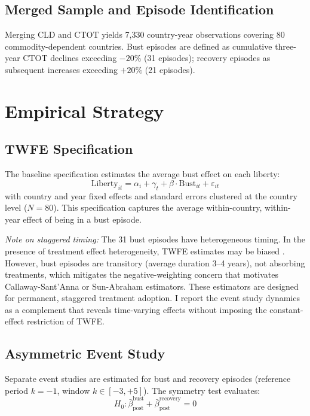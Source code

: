 \documentclass[12pt]{article}
\begin{document}
\subsection{Merged Sample and Episode Identification}

Merging CLD and CTOT yields 7,330 country-year observations covering 80 commodity-dependent countries. Bust episodes are defined as cumulative three-year CTOT declines exceeding $-20\%$ (31 episodes); recovery episodes as subsequent increases exceeding $+20\%$ (21 episodes).



\section{Empirical Strategy}

\subsection{TWFE Specification}

The baseline specification estimates the average bust effect on each liberty:
\begin{equation}
\text{Liberty}_{it} = \alpha_i + \gamma_t + \beta \cdot \text{Bust}_{it} + \varepsilon_{it}
\end{equation}
with country and year fixed effects and standard errors clustered at the country level ($N = 80$). This specification captures the average within-country, within-year effect of being in a bust episode.

\textit{Note on staggered timing:} The 31 bust episodes have heterogeneous timing. In the presence of treatment effect heterogeneity, TWFE estimates may be biased \citep{goodmanBacon2021}. However, bust episodes are transitory (average duration 3--4 years), not absorbing treatments, which mitigates the negative-weighting concern that motivates Callaway-Sant'Anna or Sun-Abraham estimators. These estimators are designed for permanent, staggered treatment adoption. I report the event study dynamics as a complement that reveals time-varying effects without imposing the constant-effect restriction of TWFE.

\subsection{Asymmetric Event Study}

Separate event studies are estimated for bust and recovery episodes (reference period $k = -1$, window $k \in [-3, +5]$). The symmetry test evaluates:
\begin{equation}
H_0: \bar{\beta}^{\text{bust}}_{\text{post}} + \bar{\beta}^{\text{recovery}}_{\text{post}} = 0
\end{equation}
\end{document}
